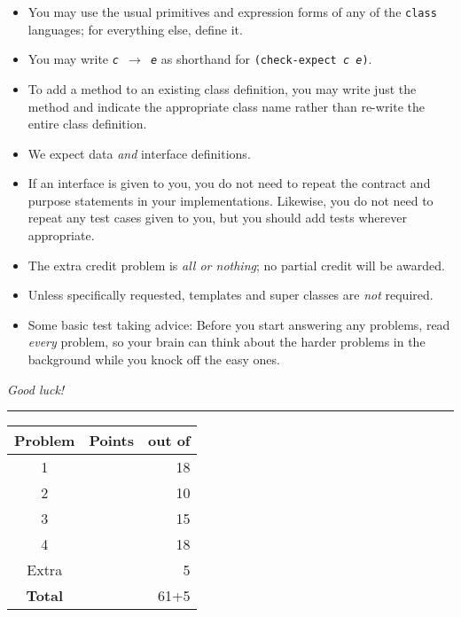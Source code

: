 \documentclass[12pt]{article}                   %
\newcommand\code[1]{\texttt{#1}}
\begin{document}
\noindent\begin{minipage}{8cm}\sloppy
\begin{itemize}
\item You may use the usual primitives and expression forms of any of
  the \code{class} languages; for everything else, define it.

\item You may write {\tt {\slshape c} $\rightarrow$ {\slshape e}} as
  shorthand for
  {\tt (check-expect {\slshape c e})}.

\item To add a method to an existing class definition, you
  may write just the method and indicate the appropriate class name
  rather than re-write the entire class definition.

\item We expect data \emph{and} interface definitions.

\item If an interface is given to you, you do not need to repeat the
  contract and purpose statements in your implementations.  Likewise,
  you do not need to repeat any test cases given to you, but you
  should add tests wherever appropriate.


\item The extra credit problem is \emph{all or nothing};  no partial
  credit will be awarded.

\item Unless specifically requested, templates and super classes are
  \emph{not} required.

\item Some basic test taking advice: Before you start answering
any problems, read \emph{every} problem, so your brain can  think
about the harder problems in the background while you knock off the easy ones.
\end{itemize}

\bigskip

\emph{Good luck!}
\end{minipage}\hfil\begin{minipage}[t]{6cm}
\rule{1cm}{0pt}\begin{tabular}{|c|l|@{/}r|}
\hline
{\bf Problem} & Points & out of \\ \hline
1 & & 18\\ \hline
2 & & 10\\ \hline
3 & & 15\\ \hline
4 & & 18\\ \hline
Extra & & 5 \\ \hline
{\bf Total} & & 61+5 \\ \hline
\end{tabular}
\end{minipage}
\end{document}
